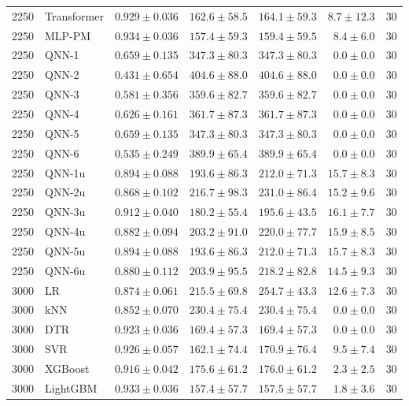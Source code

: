 \begin{longtable}{rlrrrrr}
2250 & Transformer & $0.929 \pm 0.036$ & $162.6 \pm 58.5$ & $164.1 \pm 59.3$ & $8.7 \pm 12.3$ & 30 \\
2250 & MLP-PM & $0.934 \pm 0.036$ & $157.4 \pm 59.3$ & $159.4 \pm 59.5$ & $8.4 \pm 6.0$ & 30 \\
2250 & QNN-1 & $0.659 \pm 0.135$ & $347.3 \pm 80.3$ & $347.3 \pm 80.3$ & $0.0 \pm 0.0$ & 30 \\
2250 & QNN-2 & $0.431 \pm 0.654$ & $404.6 \pm 88.0$ & $404.6 \pm 88.0$ & $0.0 \pm 0.0$ & 30 \\
2250 & QNN-3 & $0.581 \pm 0.356$ & $359.6 \pm 82.7$ & $359.6 \pm 82.7$ & $0.0 \pm 0.0$ & 30 \\
2250 & QNN-4 & $0.626 \pm 0.161$ & $361.7 \pm 87.3$ & $361.7 \pm 87.3$ & $0.0 \pm 0.0$ & 30 \\
2250 & QNN-5 & $0.659 \pm 0.135$ & $347.3 \pm 80.3$ & $347.3 \pm 80.3$ & $0.0 \pm 0.0$ & 30 \\
2250 & QNN-6 & $0.535 \pm 0.249$ & $389.9 \pm 65.4$ & $389.9 \pm 65.4$ & $0.0 \pm 0.0$ & 30 \\
2250 & QNN-1u & $0.894 \pm 0.088$ & $193.6 \pm 86.3$ & $212.0 \pm 71.3$ & $15.7 \pm 8.3$ & 30 \\
2250 & QNN-2u & $0.868 \pm 0.102$ & $216.7 \pm 98.3$ & $231.0 \pm 86.4$ & $15.2 \pm 9.6$ & 30 \\
2250 & QNN-3u & $0.912 \pm 0.040$ & $180.2 \pm 55.4$ & $195.6 \pm 43.5$ & $16.1 \pm 7.7$ & 30 \\
2250 & QNN-4u & $0.882 \pm 0.094$ & $203.2 \pm 91.0$ & $220.0 \pm 77.7$ & $15.9 \pm 8.5$ & 30 \\
2250 & QNN-5u & $0.894 \pm 0.088$ & $193.6 \pm 86.3$ & $212.0 \pm 71.3$ & $15.7 \pm 8.3$ & 30 \\
2250 & QNN-6u & $0.880 \pm 0.112$ & $203.9 \pm 95.5$ & $218.2 \pm 82.8$ & $14.5 \pm 9.3$ & 30 \\
\midrule
3000 & LR & $0.874 \pm 0.061$ & $215.5 \pm 69.8$ & $254.7 \pm 43.3$ & $12.6 \pm 7.3$ & 30 \\
3000 & kNN & $0.852 \pm 0.070$ & $230.4 \pm 75.4$ & $230.4 \pm 75.4$ & $0.0 \pm 0.0$ & 30 \\
3000 & DTR & $0.923 \pm 0.036$ & $169.4 \pm 57.3$ & $169.4 \pm 57.3$ & $0.0 \pm 0.0$ & 30 \\
3000 & SVR & $0.926 \pm 0.057$ & $162.1 \pm 74.4$ & $170.9 \pm 76.4$ & $9.5 \pm 7.4$ & 30 \\
3000 & XGBoost & $0.916 \pm 0.042$ & $175.6 \pm 61.2$ & $176.0 \pm 61.2$ & $2.3 \pm 2.5$ & 30 \\
3000 & LightGBM & $0.933 \pm 0.036$ & $157.4 \pm 57.7$ & $157.5 \pm 57.7$ & $1.8 \pm 3.6$ & 30 \\

\end{longtable}
